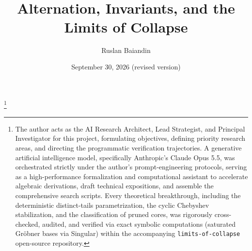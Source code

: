 \documentclass[11pt]{amsart}
\theoremstyle{plain}
\theoremstyle{definition}
\theoremstyle{remark}
\numberwithin{equation}{section}
\newcommand{\code}[1]{{\ttfamily\nolinkurl{#1}}}
\begin{document}
\title[Alternation, invariants, and the limits of collapse]{Alternation, Invariants, and the Limits of Collapse}
\author{Ruslan Baiandin}
\address{Graduate School of Economics and Management, Ural Federal University, Yekaterinburg, 620002, Russia}
\thanks{The author acts as the AI Research Architect, Lead Strategist, and Principal Investigator for this project, formulating objectives, defining priority research areas, and directing the programmatic verification trajectories. A generative artificial intelligence model, specifically Anthropic's Claude Opus 5.5, was orchestrated strictly under the author's prompt-engineering protocols, serving as a high-performance formalization and computational assistant to accelerate algebraic derivations, draft technical expositions, and assemble the comprehensive search scripts. Every theoretical breakthrough, including the deterministic distinct-tails parametrization, the cyclic Chebyshev stabilization, and the classification of pruned cores, was rigorously cross-checked, audited, and verified via exact symbolic computations (saturated Gr{\"o}bner bases via Singular) within the accompanying \code{limits-of-collapse} open-source repository.}
\date{September 30, 2026 (revised version)}
\end{document}

